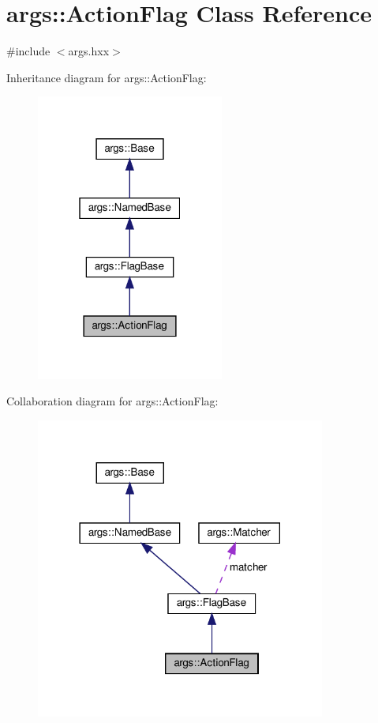 \hypertarget{classargs_1_1_action_flag}{}\section{args\+:\+:Action\+Flag Class Reference}
\label{classargs_1_1_action_flag}


{\ttfamily \#include $<$args.\+hxx$>$}



Inheritance diagram for args\+:\+:Action\+Flag\+:\nopagebreak
\begin{figure}[H]
\begin{center}
\leavevmode
\includegraphics[width=175pt]{classargs_1_1_action_flag__inherit__graph}
\end{center}
\end{figure}


Collaboration diagram for args\+:\+:Action\+Flag\+:\nopagebreak
\begin{figure}[H]
\begin{center}
\leavevmode
\includegraphics[width=270pt]{classargs_1_1_action_flag__coll__graph}
\end{center}
\end{figure}
